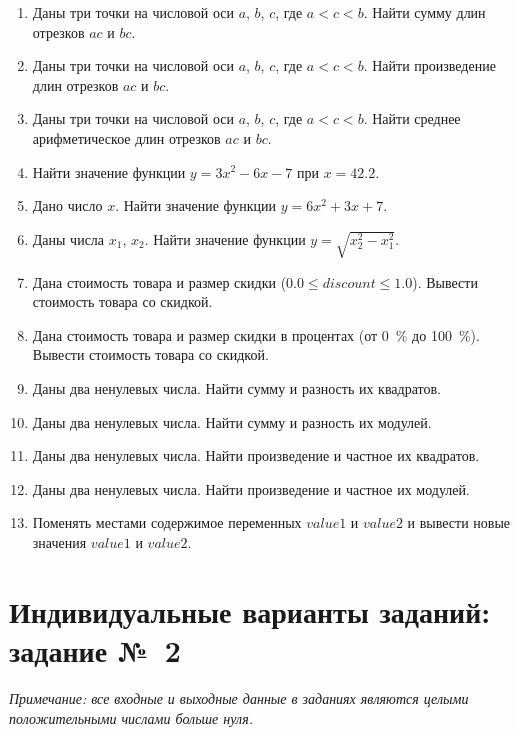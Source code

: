 \documentclass[main.tex]{subfiles}
\begin{document}
\begin{enumerate}
    \item Даны три точки на числовой оси $a$, $b$, $c$, где $a < c < b$. Найти сумму длин отрезков $ac$ и $bc$.
    \item Даны три точки на числовой оси $a$, $b$, $c$, где $a < c < b$. Найти произведение длин отрезков $ac$ и $bc$.
    \item Даны три точки на числовой оси $a$, $b$, $c$, где $a < c < b$. Найти среднее арифметическое длин отрезков $ac$ и $bc$.
    \item Найти значение функции $y = 3 x^2 - 6 x - 7$ при $x = 42.2$.
    \item Дано число $x$. Найти значение функции $y = 6 x^2 + 3 x + 7$.
    \item Даны числа $x_1$, $x_2$. Найти значение функции $y = \sqrt{x_2^2 - x_1^2}$.
    \item Дана стоимость товара и размер скидки ($0.0 \leq discount\leq 1.0$). Вывести стоимость товара со скидкой.
    \item Дана стоимость товара и размер скидки в процентах (от 0~\% до 100~\%). Вывести стоимость товара со скидкой.
    \item Даны два ненулевых числа. Найти сумму и разность их квадратов.
    \item Даны два ненулевых числа. Найти сумму и разность их модулей.
    \item Даны два ненулевых числа. Найти произведение и частное их квадратов.
    \item Даны два ненулевых числа. Найти произведение и частное их модулей.
    \item Поменять местами содержимое переменных $value1$ и $value2$ и вывести новые значения $value1$ и $value2$.
\end{enumerate}


\section{Индивидуальные варианты заданий: задание №~2}

\textit{Примечание: все входные и выходные данные в заданиях являются целыми положительными числами больше нуля.}
\\
\end{document}
